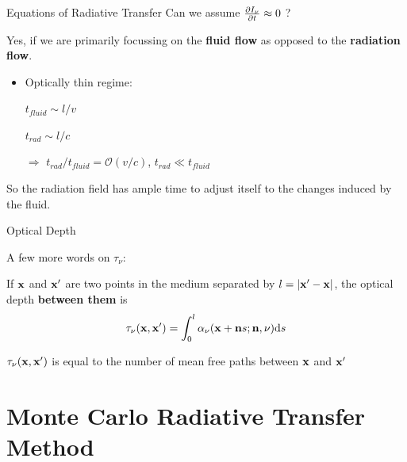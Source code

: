 




\begin{frame}{Equations of Radiative Transfer}
	Can we assume $\frac{\partial I_\nu}{\partial t} \approx 0$ ?

	Yes, if we are primarily focussing on the \textbf{fluid flow} as opposed to the \textbf{radiation flow}.

	\begin{itemize}
	\item Optically thin regime:

		$t_{fluid} \sim l / v$

		$t_{rad} \sim l / c$

		$\Rightarrow$ $t_{rad} / t_{fluid} = \mathcal{O}(v/c)$, $t_{rad} \ll t_{fluid}$
	\end{itemize}

	So the radiation field has ample time to adjust itself to the changes induced by the fluid.
\end{frame}




\begin{frame}{Optical Depth}

	A few more words on $\tau_\nu$:

	If $\mathbf{x}$ and $\mathbf{x}'$ are two points in the medium separated by $l = |\mathbf{x}' - \mathbf{x}|$, the optical depth \textbf{between them} is
	\begin{align*}
	\tau_\nu(\mathbf{x}, \mathbf{x}') = \int_0^l \alpha_\nu(\mathbf{x} + \mathbf{n}s; \mathbf{n}, \nu) \mathrm{d} s
	\end{align*}

	$	\tau_\nu(\mathbf{x}, \mathbf{x}')$ is equal to the number of mean free paths  between $\mathbf{x}$ and $\mathbf{x}'$
\end{frame}









\section{Monte Carlo Radiative Transfer Method}

